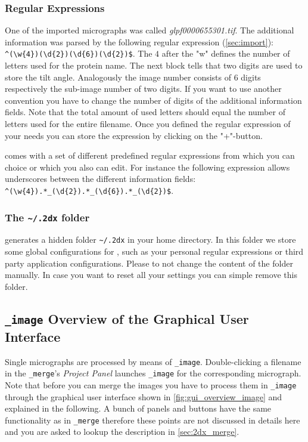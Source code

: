 \subsubsection{Regular Expressions}
\label{sec:regexp}

One of the imported micrographs was called \textit{glpf0000655301.tif}. The additional information was parsed by the following regular expression (\autoref{sec:import}): \texttt{\^{}(\textbackslash w\{4\})(\textbackslash d\{2\})(\textbackslash d\{6\})(\textbackslash d\{2\})\$}. The $4$ after the "w" defines the number of letters used for the protein name. The next block tells that two digits are used to store the tilt angle. Analogously the image number consists of $6$ digits respectively the sub-image number of two digits. If you want to use another convention you have to change the number of digits of the additional information fields. Note that the total amount of used letters should equal the number of letters used for the entire filename. Once you defined the regular expression of your needs you can store the expression by clicking on the "+"-button.

{\twodx} comes with a set of different predefined regular expressions from which you can choice or which you also can edit. For instance the following expression allows underscores between the different information fields: \texttt{\^{}(\textbackslash w\{4\}).*\_(\textbackslash d\{2\}).*\_(\textbackslash d\{6\}).*\_(\textbackslash d\{2\})\$}.

\subsubsection{The \texttt{\textasciitilde /.2dx} folder}
{\twodx} generates a hidden folder \texttt{\textasciitilde /.2dx} in your home directory. In this folder we store some global configurations for {\twodx}, such as your personal regular expressions or third party application configurations. Please to not change the content of the folder manually. In case you want to reset all your settings you can simple remove this folder.


\newpage
\subsection{{\twodx}\texttt{\_image} Overview of the Graphical User Interface}
\label{sec:2dx_image}

Single micrographs are processed by means of {\twodx}\texttt{\_image}. Double-clicking a filename in the {\twodx}\texttt{\_merge}'s \textit{Project Panel} launches {\twodx}\texttt{\_image} for the corresponding micrograph. Note that before you can merge the images you have to process them in {\twodx}\texttt{\_image} through the graphical user interface shown in \autoref{fig:gui_overview_image} and explained in the following. A bunch of panels and buttons have the same functionality as in {\twodx}\texttt{\_merge} therefore these points are not discussed in details here and you are asked to lookup the description in \autoref{sec:2dx_merge}.


